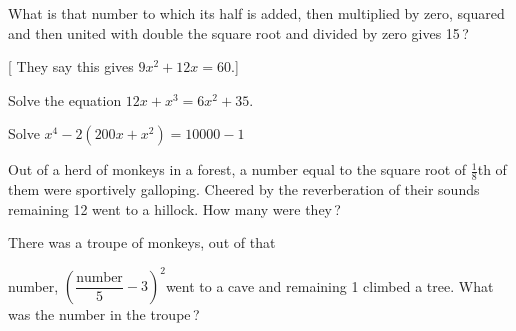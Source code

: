 \documentclass[]{article}
\begin{document}
{What is that number to which its half is added, then multiplied by
zero, squared and then united with double the square root and divided by
zero gives 15\,?

[ They say this gives $9x^2 + 12x = 60$.]

\begin{quote}  {
}  \end{quote}

{Solve the equation $12x + x^{3} = 6x^{2} + 35.$}

\begin{quote}  {
}  \end{quote}

{Solve $x^{4} - 2 (200x + x^{2}) = 10000 -1$}

\begin{quote}  {
}  \end{quote}

{Out of a herd of monkeys in a forest, a number equal to the square root
of $\frac{1}{8}$th of them were sportively galloping. Cheered by the reverberation
of their sounds remaining 12 went to a hillock. How many were they\,? }

\begin{quote}  {
}  \end{quote}

{There was a troupe of monkeys, out of that 
}
\newpage
\large

\noindent number, $\left(\dfrac{\textrm{number}}{5} - 3\right)^2$went to a cave and remaining 1 climbed a tree.
What was the number in the troupe\,?

}
\end{document}
